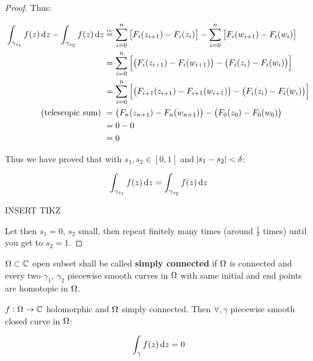 \begin{proof}
 
Thus:

\begin{align*}
    \int_{\gamma_{s_1}} f(z) \dif z - \int_{\gamma_{s_2}} f(z) \dif z & \overset{    \scalebox{0.35}{FTC}   }{=} \sum_{i=0}^n \left[ F_i (z_{i+1} ) - F_i (z_{i} )\right] - \sum_{i=0}^n \left[ F_i (w_{i+1} ) - F_i (w_{i} )\right]\\
    &= \sum_{i=0}^n \left[ \big( F_i (z_{i+1}) - F_i (w_{i+1} ) \big) - \big( F_i (z_{i}) - F_i (w_{i} ) \big) \right]\\
    &= \sum_{i=0}^n \left[ \big( F_{i+1} (z_{i+1}) - F_{i+1} (w_{i+1} ) \big) - \big( F_i (z_{i}) - F_i (w_{i} ) \big) \right]\\
    \text{(telescopic sum) } &= \big( F_n (z_{n+1}) - F_n ( w_{n+1} ) \big) - \big( F_0 (z_{0}) - F_0 ( w_{0} ) \big)\\
    &= 0 - 0\\
    &= 0
\end{align*}
 
Thus we have proved that with $s_1, s_2 \in [0,1]$ and $\abs{s_1 - s_2} < \delta$:

\begin{align*}
\int_{\gamma_{s_1}} f(z) \dif z = \int_{\gamma_{s_2}} f(z) \dif z
\end{align*}

INSERT TIKZ

Let then $s_1 =0$, $s_2$ small, then repeat finitely many times (around $\frac{1}{\delta}$ times) until you get to $s_2 = 1$.



\end{proof}


\begin{definition}
$\Omega \subset \mathbb{C}$ open subset shall be called \textbf{simply connected} if $\Omega$ is connected and every two $\gamma_1, \, \gamma_2$ piecewise smooth curves in $\Omega$ with same initial and end points are homotopic in $\Omega$.
\end{definition}


\begin{corollary}
$f:\Omega \rightarrow \mathbb{C}$ holomorphic and $\Omega$ simply connected. Then $\forall 
,\gamma$ piecewise smooth closed curve in $\Omega$:

\begin{align*}
    \int_{\gamma} f(z) \dif z = 0
\end{align*}
\end{corollary}

